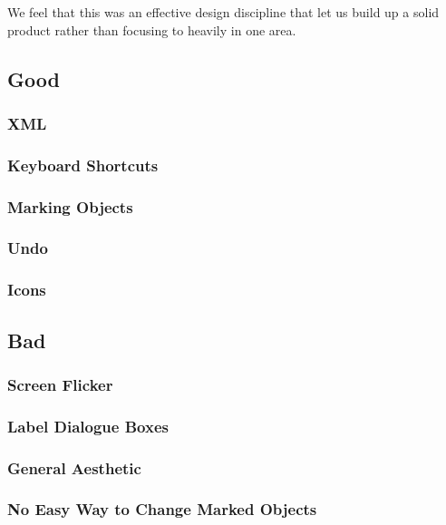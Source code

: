 \documentclass[a4paper,11pt,oneside]{article}
\begin{document}
We feel that this was an effective design discipline that let us build up a solid product rather than focusing to heavily in one area.

\subsection{Good}

\subsubsection{XML}
\subsubsection{Keyboard Shortcuts}
\subsubsection{Marking Objects}
\subsubsection{Undo}
\subsubsection{Icons}

\subsection{Bad}
\subsubsection{Screen Flicker}
\subsubsection{Label Dialogue Boxes}
\subsubsection{General Aesthetic}
\subsubsection{No Easy Way to Change Marked Objects}
\end{document}
